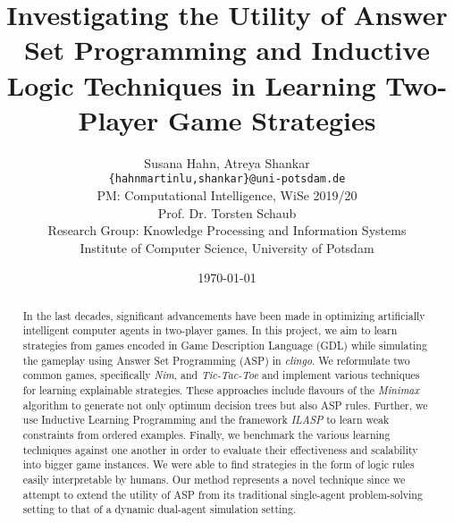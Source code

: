 \documentclass[12pt,a4paper]{article}
\title{Investigating the Utility of Answer Set Programming and Inductive Logic Techniques in Learning Two-Player Game Strategies}
\author{Susana Hahn, Atreya Shankar\\
\texttt{\{hahnmartinlu,shankar\}@uni-potsdam.de} \\
PM: Computational Intelligence, WiSe 2019/20 \\
Prof. Dr. Torsten Schaub \\
Research Group: Knowledge Processing and Information Systems \\
Institute of Computer Science, University of Potsdam}
\date{\today}
\begin{document}
\newgeometry{}
\maketitle
\thispagestyle{empty}
\begin{abstract}
In the last decades, significant advancements have been made in optimizing artificially intelligent computer agents in two-player games. In this project, we aim to learn strategies from games encoded in Game Description Language (GDL) while simulating the gameplay using Answer Set Programming (ASP) in \textit{clingo}. We reformulate two common games, specifically \textit{Nim}, and \textit{Tic-Tac-Toe} and implement various techniques for learning explainable strategies. These approaches include flavours of the \textit{Minimax} algorithm to generate not only optimum decision trees but also ASP rules. Further, we use Inductive Learning Programming and the framework \textit{ILASP} to learn weak constraints from ordered examples. Finally, we benchmark the various learning techniques against one another in order to evaluate their effectiveness and scalability into bigger game instances. We were able to find strategies in the form of logic rules easily interpretable by humans. Our method represents a novel technique since we attempt to extend the utility of ASP from its traditional single-agent problem-solving setting to that of a dynamic dual-agent simulation setting. 
\end{abstract}
\newpage
\thispagestyle{empty}
\tableofcontents
\newpage
\restoregeometry
\setcounter{page}{1}
\thispagestyle{plain}





\newpage
{}


\nocite{*}
\end{document}

